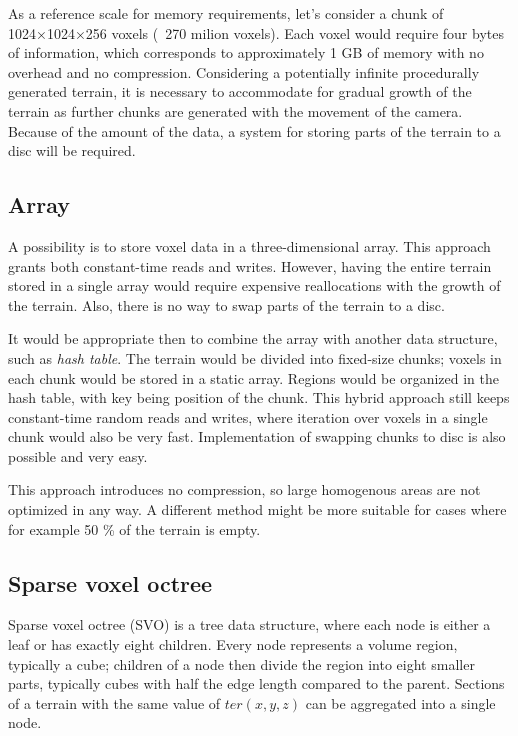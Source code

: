 As a reference scale for memory requirements, let's consider a chunk of 1024×1024×256 voxels (~270 milion voxels). Each voxel would require four bytes of information, which corresponds to approximately 1 GB of memory with no overhead and no compression. Considering a potentially infinite procedurally generated terrain, it is necessary to accommodate for gradual growth of the terrain as further chunks are generated with the movement of the camera. Because of the amount of the data, a system for storing parts of the terrain to a disc will be required.

\subsection{Array}
A possibility is to store voxel data in a three-dimensional array. This approach grants both constant-time reads and writes. However, having the entire terrain stored in a single array would require expensive reallocations with the growth of the terrain. Also, there is no way to swap parts of the terrain to a disc.

It would be appropriate then to combine the array with another data structure, such as \textit{hash table}. The terrain would be divided into fixed-size chunks; voxels in each chunk would be stored in a static array. Regions would be organized in the hash table, with key being position of the chunk.
This hybrid approach still keeps constant-time random reads and writes, where iteration over voxels in a single chunk would also be very fast. Implementation of swapping chunks to disc is also possible and very easy.

This approach introduces no compression, so large homogenous areas are not optimized in any way. A different method might be more suitable for cases where for example 50 \% of the terrain is empty.

\subsection{Sparse voxel octree}
Sparse voxel octree (SVO) is a tree data structure, where each node is either a leaf or has exactly eight children. Every node represents a volume region, typically a cube; children of a node then divide the region into eight smaller parts, typically cubes with half the edge length compared to the parent. Sections of a terrain with the same value of $ter(x, y, z)$ can be aggregated into a single node.

